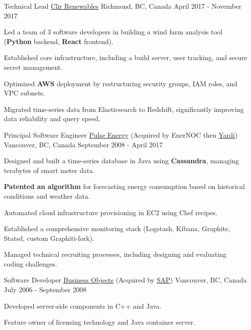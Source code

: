 \begin{cventries}

  \cventry
    {Technical Lead} %
    {\href{https://www.clir.eco}{Clir Renewables}} %
    {Richmond, BC, Canada} %
    {April 2017 - November 2017} %
    {
      \begin{cvitems} %
        \item{Led a team of 3 software developers in building a wind farm analysis tool (\textbf{Python} backend, \textbf{React} frontend).}
        \item{Established core infrastructure, including a build server, user tracking, and secure secret management.}
        \item{Optimized \textbf{AWS} deployment by restructuring security groups, IAM roles, and VPC subnets.}
        \item{Migrated time-series data from Elasticsearch to Redshift, significantly improving data reliability and query speed.}
      \end{cvitems}
    }


  \cventry
    {Principal Software Engineer} %
    {\href{http://pulseenergy.com}{Pulse Energy} (Acquired by EnerNOC then \href{https://www.yardi.com}{Yardi})} %
    {Vancouver, BC, Canada} %
    {September 2008 - April 2017} %
    {
      \begin{cvitems} %
        \item{Designed and built a time-series database in Java using \textbf{Cassandra}, managing terabytes of smart meter data.}
        \item{\textbf{Patented an algorithm} for forecasting energy consumption based on historical conditions and weather data.}
        \item{Automated cloud infrastructure provisioning in EC2 using Chef recipes.}
        \item{Established a comprehensive monitoring stack (Logstash, Kibana, Graphite, Statsd, custom Graphiti-fork).}
        \item{Managed technical recruiting processes, including designing and evaluating coding challenges.}
      \end{cvitems}
    }

  \cventry
    {Software Developer} %
    {\href{http://businessobjects.com}{Business Objects} (Acquired by \href{https://www.sap.com}{SAP})} %
    {Vancouver, BC, Canada} %
    {July 2006 - September 2008 } %
    {
      \begin{cvitems} %
        \item{Developed server-side components in C++ and Java.}
        \item{Feature owner of licensing technology and Java container server.}
      \end{cvitems}
    }

\end{cventries}

